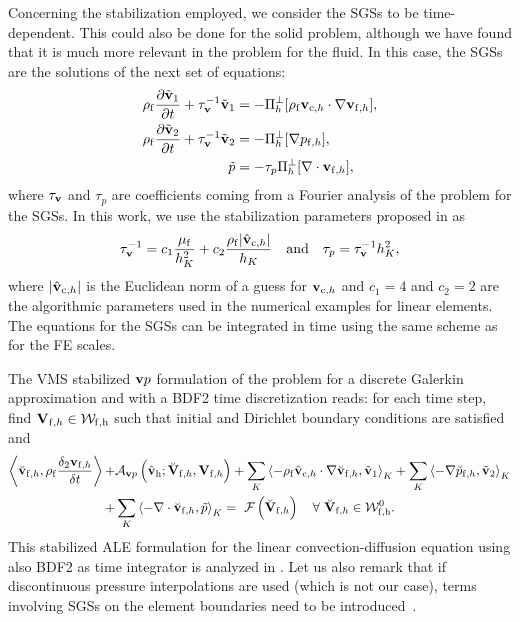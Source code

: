 \documentclass[11pt,english]{article}
\def\alevelocityh{\vb{v}_{\mathrm{c},h}}
\def\hatalevelocityh{\hat{\vb{v}}_{\mathrm{c},h}}
\def\densfluid{\rho_{\rm{f}}}                %
\def\viscfluid{\mu_{\rm{f}}}                 %
\def\testfluidh{\breve{\vb{V}}_{{\rm f} ,h}}
\def\testvfluidh{\breve{\vb{v}}_{{\rm f} ,h}}
\def\testpfluidh{\breve{p}_{{\rm f},h}}
\def\unknofluidh{\vb{V}_{\mathrm{f},h}}
\def\vfluidh{\vb{v}_{{\mathrm{f}},h}}
\def\pfluidh{p_{{\mathrm{f}},h}}
\def\vhath{\hat{\vb{v}}_{\rm{h}}}
\def\unknofluidspaceh{\mathcal{W}_{\rm{f},\rm{h}}}        %
\def\testfluidspaceh{\mathcal{W}_{\rm{f},\rm{h}}^{0}}     %
\def\vp{\vb{v}p}
\begin{document}
Concerning the stabilization employed, we consider the SGSs to be time-dependent. This could also be done for the solid problem, although we have found that it is much more relevant in the problem for the fluid. In this case, the SGSs are the solutions of the next set of equations:
\begin{align*}
    \densfluid\frac{\partial\tilde{\vb{v}}_{1}}{\partial t}+\tau_{\vb{v}}^{-1}\tilde{\vb{v}}_{1}  &=-\Pi_{h}^{\bot}[\densfluid\alevelocityh\cdot\nabla\vfluidh],\\
    \densfluid\frac{\partial\tilde{\vb{v}}_{2}}{\partial t}+\tau_{\vb{v}}^{-1}\tilde{\vb{v}}_{2}  &=-\Pi_{h}^{\bot}[\nabla \pfluidh],\\
    \tilde{p} &=-\tau_p\Pi_{h}^{\bot}[\nabla\cdot\vfluidh],
\end{align*}
where $\tau_{\vb{v}}$ and $\tau_p$ are coefficients coming from a Fourier analysis of the problem for the SGSs. In this work, we use the stabilization parameters proposed in \cite{CodinaVMS} as
\begin{equation}
     \tau_{\vb{v}}^{-1} = c_1 \frac{\viscfluid}{h_K^2} + c_2 \frac{\densfluid\abs{\hatalevelocityh}}{h_K} \quad \text{and} \quad \tau_p = \tau_{\vb{v}}^{-1}h_K^2,
     \label{eq:26bis}
\end{equation}
where $\abs{\hatalevelocityh}$ is the Euclidean norm of a guess for $\alevelocityh$ and $c_1=4$ and $c_2=2$ are the algorithmic parameters used in the numerical examples for linear elements. The equations for the SGSs can be integrated in time using the same scheme as for the FE scales.

The VMS stabilized $\vp$ formulation of the problem for a discrete Galerkin approximation and with a BDF2 time discretization reads: for each time step, find $\unknofluidh \in  \unknofluidspaceh $ such that initial and Dirichlet boundary conditions are satisfied and
\begin{align*}
\begin{split}
  \left \langle \testvfluidh, \densfluid\frac{\delta_2 \vfluidh}{\delta t} \right \rangle +&  \mathcal{A}_{\vp} \left (\vhath; \testfluidh, \unknofluidh \right) 
  + \sum_{K} \left \langle  - \densfluid\hatalevelocityh \cdot \nabla \testvfluidh ,  \tilde{\vb{v}}_1\right \rangle_K 
  + \sum_{K} \left \langle  -\nabla \testpfluidh, \tilde{\vb{v}}_2 \right \rangle_K \\
  + &\sum_{K} \left \langle  -\nabla \cdot \testvfluidh, \tilde{p} \right \rangle_K =  ~\mathcal{F} \left ( \testfluidh  \right) \quad \forall \ \testfluidh \in \testfluidspaceh.
\end{split}
\end{align*}
This stabilized ALE formulation for the linear convection-diffusion equation using also BDF2 as time integrator is analyzed in \cite{badia-codina-2006-1}. Let us also remark that if discontinuous pressure interpolations are used (which is not our case), terms involving SGSs on the element boundaries need to be introduced~\cite{codina-et-al-2009-1}.
\end{document}

